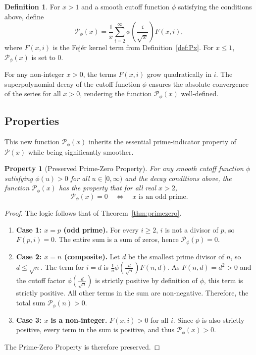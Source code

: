 \documentclass[11pt,a4paper]{amsart}
\newcommand{\Px}{\mathcal{P}}
\theoremstyle{plain}
\newtheorem{property}[theorem]{Property}
\theoremstyle{definition}
\newtheorem{definition}[theorem]{Definition}
\begin{document}
\begin{definition}\label{def:Pphi}
For $x>1$ and a smooth cutoff function $\phi$ satisfying the conditions above, define
\begin{equation}\label{eq:Pphi}
\Px_{\phi}(x) = \frac{1}{x} \sum_{i=2}^{\infty} \phi\left(\frac{i}{\sqrt{x}}\right) F(x,i),
\end{equation}
where $F(x,i)$ is the Fejér kernel term from Definition~\ref{def:Px}. For $x\le1$, $\Px_{\phi}(x)$ is set to $0$.
\end{definition}
For any non-integer $x>0$, the terms $F(x,i)$ grow quadratically in $i$. The superpolynomial decay of the cutoff function $\phi$ ensures the absolute convergence of the series for all $x>0$, rendering the function $\Px_{\phi}(x)$ well-defined.

\subsection{Properties}
This new function $\Px_{\phi}(x)$ inherits the essential prime-indicator property of $\Px(x)$ while being significantly smoother.
\begin{property}[Preserved Prime-Zero Property]\label{prop:Pphizero}
For any smooth cutoff function $\phi$ satisfying $\phi(u)>0$ for all $u\in[0, \infty)$ and the decay conditions above, the function $\Px_{\phi}(x)$ has the property that for all real $x>2$,
\[
\Px_{\phi}(x)=0 \quad\Longleftrightarrow\quad x \text{ is an odd prime}.
\]
\end{property}
\begin{proof}
The logic follows that of Theorem~\ref{thm:primezero}.
\begin{enumerate}
    \item \textbf{Case 1: $x = p$ (odd prime).} For every $i\ge 2$, $i$ is not a divisor of $p$, so $F(p,i)=0$. The entire sum is a sum of zeros, hence $\Px_{\phi}(p)=0$.
    \item \textbf{Case 2: $x = n$ (composite).} Let $d$ be the smallest prime divisor of $n$, so $d\le\sqrt{n}$. The term for $i=d$ is $\frac{1}{n}\phi(\frac{d}{\sqrt{n}})F(n,d)$. As $F(n,d)=d^2 > 0$ and the cutoff factor $\phi(\frac{d}{\sqrt{n}})$ is strictly positive by definition of $\phi$, this term is strictly positive. All other terms in the sum are non-negative. Therefore, the total sum $\Px_{\phi}(n)>0$.
    \item \textbf{Case 3: $x$ is a non-integer.} $F(x,i) > 0$ for all $i$. Since $\phi$ is also strictly positive, every term in the sum is positive, and thus $\Px_{\phi}(x)>0$.
\end{enumerate}
The Prime-Zero Property is therefore preserved.
\end{proof}
\end{document}
